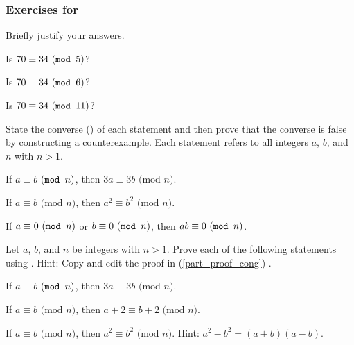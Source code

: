 
\subsubsection*{Exercises for 
\subcongmod}

\begin{exer}[\exerP] %
\label{exer_check_congruent_modn}
    Briefly justify your answers.
        \begin{exerpart}
            \item Is $70 \equiv 34 ~(\texttt{mod }5)$?
            \item Is $70 \equiv 34 ~(\texttt{mod }6)$?
            \item  Is $70 \equiv 34 ~(\texttt{mod }11)$?
        \end{exerpart}
\end{exer}

\begin{exer}[\exerU] %
\label{exer_converse_cex_cong_modn}
    State the converse () of each statement and then prove that the converse is false by constructing a counterexample. Each statement refers to all integers $a$, $b$, and $n$ with $n>1$.  
        \begin{exerpart}
            \item If $a \equiv b ~(\texttt{mod }n)$, then $3a \equiv 3b\text{ (mod }n)$.
            \item If $a \equiv b \text{ (mod }n)$, then $a^2 \equiv b^2\text{ (mod }n)$.  
            \item If $a \equiv 0 ~(\texttt{mod }n)$ or $b \equiv 0 ~(\texttt{mod }n)$, then $ab \equiv 0 ~(\texttt{mod }n)$.
        \end{exerpart}
\end{exer}

\begin{exer}[\exerU] %
\label{exer_proof_cong_modn}
    Let $a$, $b$, and $n$ be integers with $n>1$.  Prove each of the following statements using .  Hint: Copy and edit the proof in  (\ref{part_proof_cong}) . 
        \begin{exerpart}
            \item If $a \equiv b ~(\texttt{mod }n)$, then $3a \equiv 3b\text{ (mod }n)$.
            \item If $a \equiv b \text{ (mod }n)$, then $a+2 \equiv b+2\text{ (mod }n)$.
            \item If $a \equiv b \text{ (mod }n)$, then $a^2 \equiv b^2\text{ (mod }n)$.  Hint: $a^2-b^2=(a+b)(a-b)$.
        \end{exerpart}
\end{exer}

